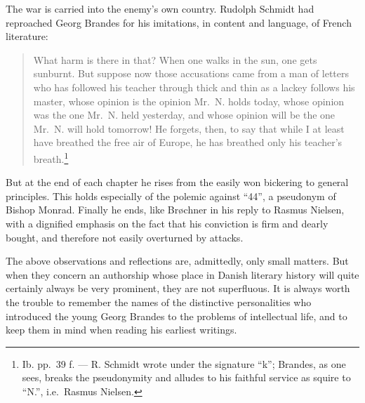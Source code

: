 \documentclass[12pt,a4paper,openany]{book}
\newcommand{\opage}[1]{\marginnote{\footnotesize\textit{[#1]}}}
\begin{document}
The war is carried into the enemy's own country. Rudolph Schmidt had reproached Georg Brandes for his imitations,
in content and language, of French literature:

\begin{quote}\small

What harm is there in that? When one walks in the sun, one gets sunburnt. But suppose now those accusations came
from a man of letters who has followed his teacher through thick and thin as a lackey follows his master, whose
opinion is the opinion Mr.~N. holds today, whose opinion was the one Mr.~N. held yesterday, and whose opinion will
be the one Mr.~N. will hold tomorrow! He forgets, then, to say that while I at least have breathed the free air of
Europe, he has breathed only his teacher's breath.\footnote{Ib. pp.~39 f. --- R. Schmidt wrote under the signature
``k''; Brandes, as one sees, breaks the pseudonymity and alludes to his faithful service as squire to ``N.'', i.e.\
Rasmus Nielsen.}

\medskip

\end{quote}

But at the end of each chapter he rises from the easily won bickering to general principles. This holds especially
of the polemic against ``44'', a pseudonym of Bishop Monrad. Finally he ends, like Brøchner in his reply to Rasmus
Nielsen, with a dignified emphasis on the fact that his conviction is firm and dearly bought, and therefore not
easily overturned by attacks.

\medskip

\opage{162}\setcounter{footnote}{0}%
The above observations and reflections are, admittedly, only small matters. But when they concern an authorship
whose place in Danish literary history will quite certainly always be very prominent, they are not superfluous. It is
always worth the trouble to remember the names of the distinctive personalities who introduced the young Georg
Brandes to the problems of intellectual life, and to keep them in mind when reading his earliest writings.
\end{document}
